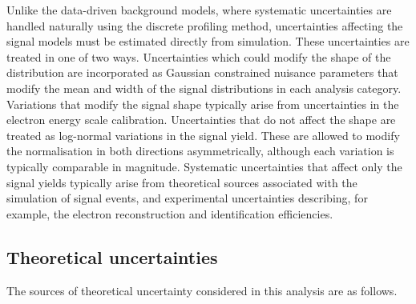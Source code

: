Unlike the data-driven background models, where systematic uncertainties are handled naturally using the discrete profiling method, uncertainties affecting the signal models must be estimated directly from simulation. These uncertainties are treated in one of two ways. Uncertainties which could modify the shape of the \mee distribution are incorporated as Gaussian constrained nuisance parameters that modify the mean and width of the signal distributions in each analysis category. %
Variations that modify the signal shape typically arise from uncertainties in the electron energy scale calibration. Uncertainties that do not affect the \mee shape are treated as log-normal variations in the signal yield. These are allowed to modify the normalisation in both directions asymmetrically, although each variation is typically comparable in magnitude. Systematic uncertainties that affect only the signal yields typically arise from theoretical sources associated with the simulation of signal events, and experimental uncertainties describing, for example, the electron reconstruction and identification efficiencies.

\subsection{Theoretical uncertainties} 

The sources of theoretical uncertainty considered in this analysis are as follows.
   
  
